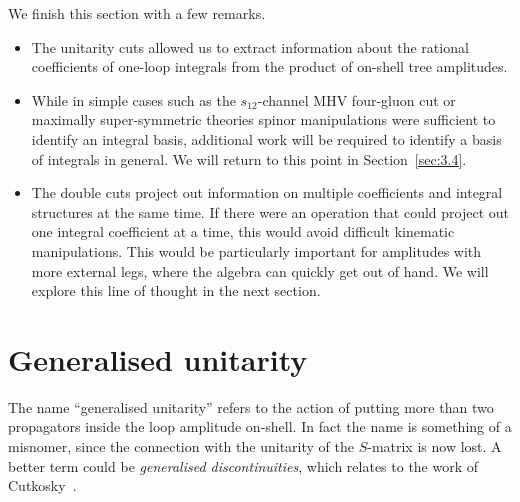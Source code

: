 We finish this section with a few remarks.
\begin{itemize}
  \item The unitarity cuts allowed us to extract information about the rational
    coefficients of one-loop integrals from the product of on-shell tree
    amplitudes.
  \smallskip
  \item While in simple cases such as the $s_{12}$-channel MHV four-gluon cut or
    maximally super-symmetric theories spinor manipulations were sufficient to
    identify an integral basis, additional work will be
    required to identify a basis of integrals in general. We will return to this point in Section~\ref{sec:3.4}.
  \smallskip
  \item The double cuts project out information on multiple coefficients and
    integral structures at the same time. If there were an operation that could
    project out one integral coefficient at a time, this would avoid difficult
    kinematic manipulations. This would be particularly important for
    amplitudes with more external legs, where the algebra can quickly get out of
    hand. We will explore this line of thought in the next section.
\end{itemize}

\section{Generalised unitarity \label{sec:3.3}}

The name ``generalised unitarity'' refers to the action of putting more than two
propagators inside the loop amplitude on-shell. In fact the name is something
of a misnomer, since the connection with the unitarity of the $S$-matrix is now
lost. A better term could be \textit{generalised discontinuities}, which relates
to the work of Cutkosky~\cite{ch3_Cutkosky:1960sp}.

